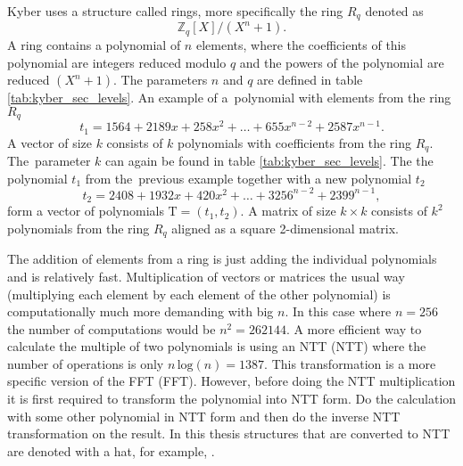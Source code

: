 Kyber uses a structure called rings, more specifically the ring $R_q$ denoted as
\begin{equation}
  \mathbb{Z}_q[X]/(X^n+1).
\end{equation}
A ring contains a polynomial of $n$ elements, where the coefficients of this polynomial are integers reduced modulo $q$ and the powers of the polynomial are reduced $(X^n+1)$. The parameters $n$ and $q$ are defined in table \ref{tab:kyber_sec_levels}. An example of a~polynomial with elements from the ring $R_q$
\begin{equation}
  t_1 = 1564 + 2189x + 258x^2 + \dots + 655x^{n-2} + 2587x^{n-1}.
\end{equation}
A vector of size $k$ consists of $k$ polynomials with coefficients from the ring $R_q$. The~parameter $k$ can again be found in table \ref{tab:kyber_sec_levels}. The the polynomial $t_1$ from the~previous example together with a new polynomial $t_2$
\begin{equation}
  t_2 = 2408 + 1932x + 420x^2 + \dots + 3256^{n-2} + 2399^{n-1},
\end{equation}
form a vector of polynomials $\mathrm{T}=(t_1, t_2)$. A matrix of size $k\times k$ consists of $k^2$ polynomials from the ring $R_q$ aligned as a square 2-dimensional matrix. \cite{YbbuGxVPF0GGTxfN}

The addition of elements from a ring is just adding the individual polynomials and is relatively fast. Multiplication of vectors or matrices the usual way (multiplying each element by each element of the other polynomial) is computationally much more demanding with big $n$. In this case where $n=256$ the number of computations would be $n^2=262144$. A more efficient way to calculate the multiple of two polynomials is using an NTT (\acl{NTT}) where the number of operations is only $n\,\mathrm{log}(n)=1387$. This transformation is a more specific version of the FFT (\acl{FFT}). However, before doing the NTT multiplication it is first required to transform the polynomial into NTT form. Do the calculation with some other polynomial in NTT form and then do the inverse NTT transformation on the result. In this thesis structures that are converted to NTT are denoted with a hat, for example, . \cite{Liang2021}
